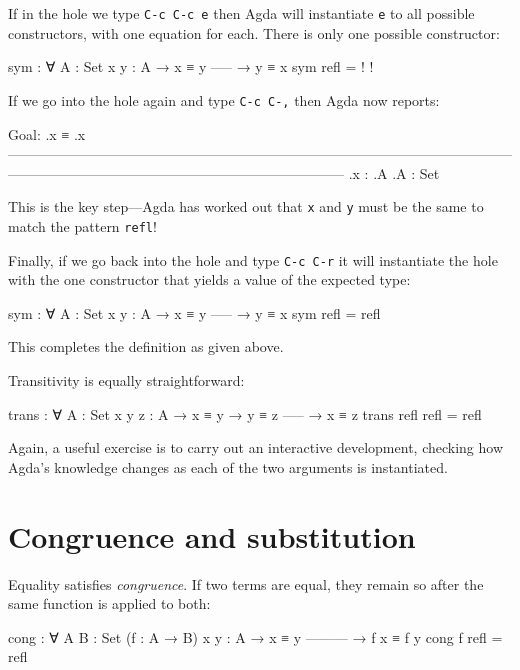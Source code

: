 If in the hole we type \texttt{C-c\ C-c\ e} then Agda will instantiate
\texttt{e} to all possible constructors, with one equation for each.
There is only one possible constructor:

\begin{myDisplay}
sym : ∀ {A : Set} {x y : A}
  → x ≡ y
    -----
  → y ≡ x
sym refl = {! !}
\end{myDisplay}

If we go into the hole again and type \texttt{C-c\ C-,} then Agda now
reports:

\begin{myDisplay}
 Goal: .x ≡ .x
 ————————————————————————————————————————————————————————————
 .x : .A
 .A : Set
\end{myDisplay}

This is the key step---Agda has worked out that \texttt{x} and
\texttt{y} must be the same to match the pattern \texttt{refl}!

Finally, if we go back into the hole and type \texttt{C-c\ C-r} it will
instantiate the hole with the one constructor that yields a value of the
expected type:

\begin{myDisplay}
sym : ∀ {A : Set} {x y : A}
  → x ≡ y
    -----
  → y ≡ x
sym refl = refl
\end{myDisplay}

This completes the definition as given above.

Transitivity is equally straightforward:

\begin{fence}
\begin{code}
trans : ∀ {A : Set} {x y z : A}
  → x ≡ y
  → y ≡ z
    -----
  → x ≡ z
trans refl refl  =  refl
\end{code}
\end{fence}

Again, a useful exercise is to carry out an interactive development,
checking how Agda's knowledge changes as each of the two arguments is
instantiated.

\hypertarget{Equality-cong}{%
\section{Congruence and substitution}\label{Equality-cong}}

Equality satisfies \emph{congruence}. If two terms are equal, they
remain so after the same function is applied to both:

\begin{fence}
\begin{code}
cong : ∀ {A B : Set} (f : A → B) {x y : A}
  → x ≡ y
    ---------
  → f x ≡ f y
cong f refl  =  refl
\end{code}
\end{fence}

